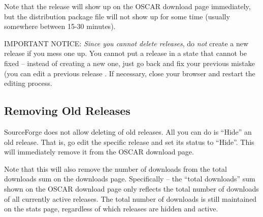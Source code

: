 Note that the release will show up on the OSCAR download page
immediately, but the distribution package file will not show up for
some time (usually somewhere between 15-30 minutes).

{\large IMPORTANT NOTICE}: {\em Since you cannot delete releases}, do
{\em not} create a new release if you mess one up.  You cannot put a
release in a state that cannot be fixed -- instead of creating a new
one, just go back and fix your previous mistake (you can edit a
previous release .  If necessary, close
your browser and restart the editing process.

\subsection{Removing Old Releases}

SourceForge does not allow deleting of old releases.  All you can do
is ``Hide'' an old release.  That is, go edit the specific release and
set its status to ``Hide''.  This will immediately remove it from the
OSCAR download page.

Note that this will also remove the number of downloads from the total
downloads sum on the downloads page.  Specifically -- the ``total
downloads'' sum shown on the OSCAR download page only reflects the
total number of downloads of all currently active releases.  The total
number of downloads is still maintained on the stats page, regardless
of which releases are hidden and active.

